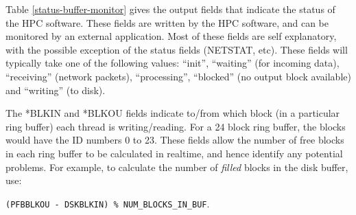 \documentclass[11pt]{article} %
\begin{document}
Table \ref{status-buffer-monitor} gives the output fields that indicate the status of the HPC software. These fields are written by the HPC software, and can be monitored by an external application. Most of these fields are self explanatory, with the possible exception of the status fields (NETSTAT, etc). These fields will typically take one of the following values: ``init'', ``waiting'' (for incoming data), ``receiving'' (network packets), ``processing'', ``blocked'' (no output block available) and ``writing'' (to disk).

The *BLKIN and *BLKOU fields indicate to/from which block (in a particular ring buffer) each thread is writing/reading. For a 24 block ring buffer, the blocks would have the ID numbers 0 to 23. These fields allow the number of free blocks in each ring buffer to be calculated in realtime, and hence identify any potential problems. For example, to calculate the number of {\em filled} blocks in the disk buffer, use:

\texttt{(PFBBLKOU - DSKBLKIN) \% NUM\_BLOCKS\_IN\_BUF}.
\end{document}
